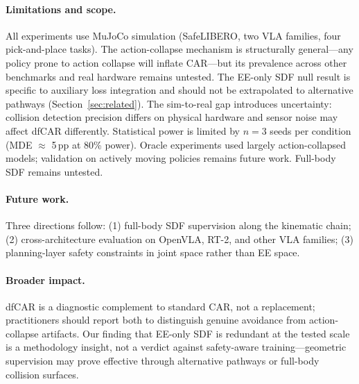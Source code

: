 \paragraph{Limitations and scope.}
All experiments use MuJoCo simulation (SafeLIBERO, two VLA families, four pick-and-place tasks). The action-collapse mechanism is structurally general---any policy prone to action collapse will inflate CAR---but its prevalence across other benchmarks and real hardware remains untested. The EE-only SDF null result is specific to auxiliary loss integration and should not be extrapolated to alternative pathways (Section~\ref{sec:related}). The sim-to-real gap introduces uncertainty: collision detection precision differs on physical hardware and sensor noise may affect dfCAR differently. Statistical power is limited by $n{=}3$ seeds per condition (MDE ${\approx}$ 5\,pp at 80\% power). Oracle experiments used largely action-collapsed models; validation on actively moving policies remains future work. Full-body SDF remains untested.

\paragraph{Future work.}
Three directions follow: (1) full-body SDF supervision along the kinematic chain; (2) cross-architecture evaluation on OpenVLA, RT-2, and other VLA families; (3) planning-layer safety constraints in joint space rather than EE space.

\paragraph{Broader impact.}
dfCAR is a diagnostic complement to standard CAR, not a replacement; practitioners should report both to distinguish genuine avoidance from action-collapse artifacts. Our finding that EE-only SDF is redundant at the tested scale is a methodology insight, not a verdict against safety-aware training---geometric supervision may prove effective through alternative pathways or full-body collision surfaces.

